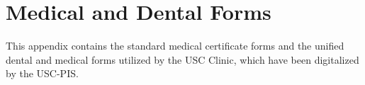 
\chapter{Medical and Dental Forms}
\label{appendix:medical_dental_forms}

This appendix contains the standard medical certificate forms and the unified dental and medical forms utilized by the USC Clinic, which have been digitalized by the USC-PIS.



